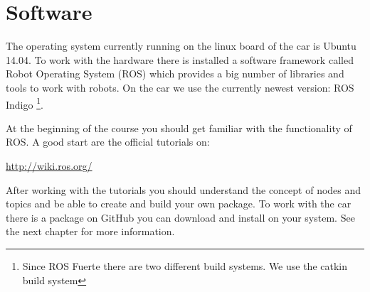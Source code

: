 \section{Software}
\label{sec:overview_software}

The operating system currently running on the linux board of the car is Ubuntu 14.04. To work with the hardware there is installed a software framework called Robot Operating System (ROS) which provides a big number of libraries and tools to work with robots. On the car we use the currently newest version: ROS Indigo \footnote{Since ROS Fuerte there are two different build systems. We use the catkin build system}. 

 At the beginning of the course you should get familiar with the functionality of ROS. A good start are the official tutorials on: 

\hyperref[http://wiki.ros.org/]{http://wiki.ros.org/}

After working with the tutorials you should understand the concept of nodes and topics and be able to create and build your own package. To work with the car there is a package on GitHub you can download and install on your system. See the next chapter for more information.





